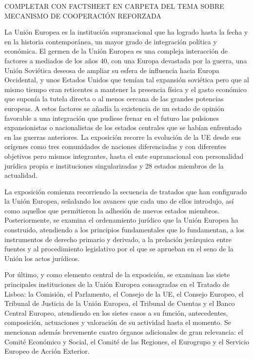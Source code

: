 \documentclass{nuevotema}
\begin{document}
\ideaclave

COMPLETAR CON FACTSHEET EN CARPETA DEL TEMA SOBRE MECANISMO DE COOPERACIÓN REFORZADA

La Unión Europea es la institución supranacional que ha logrado hasta la fecha y en la historia contemporánea, un mayor grado de integración política y económica. El germen de la Unión Europea es una compleja interacción de factores a mediados de los años 40, con una Europa devastada por la guerra, una Unión Soviética deseosa de ampliar su esfera de influencia hacia Europa Occidental, y unos Estados Unidos que temían tal expansión soviética pero que al mismo tiempo eran reticentes a mantener la presencia física y el gasto económico que suponía la tutela directa o al menos cercana de las grandes potencias europeas. A estos factores se añadía la existencia de un estado de opinión favorable a una integración que pudiese frenar en el futuro las pulsiones expansionistas o nacionalistas de los estados centrales que se habían enfrentado en las guerras anteriores. La exposición recorre la evolución de la UE desde sus orígenes como tres comunidades de naciones diferenciadas y con diferentes objetivos pero mismos integrantes, hasta el ente supranacional con personalidad jurídica propia e instituciones singularizadas y 28 estados miembros de la actualidad.

La exposición comienza recorriendo la secuencia de tratados que han configurado la Unión Europea, señalando los avances que cada uno de ellos introdujo, así como aquellos que permitieron la adhesión de nuevos estados miembros. Posteriormente, se examina el ordenamiento jurídico que la Unión Europea ha construido, atendiendo a los principios fundamentales que lo fundamentan, a los instrumentos de derecho primario y derivado, a la prelación jerárquica entre fuentes y al procedimiento legislativo por el que se aprueban en el seno de la Unión los actos jurídicos.

Por último, y como elemento central de la exposición, se examinan las siete principales instituciones de la Unión Europea consagradas en el Tratado de Lisboa: la Comisión, el Parlamento, el Consejo de la UE, el Consejo Europeo, el Tribunal de Justicia de la Unión Europea, el Tribunal de Cuentas y el Banco Central Europeo, atendiendo en los sietes casos a su función, antecedentes, composición, actuaciones y valoración de su actividad hasta el momento. Se mencionan además brevemente cuatro órganos adicionales de gran relevancia: el Comité Económico y Social, el Comité de las Regiones, el Eurogrupo y el Servicio Europeo de Acción Exterior. 
\end{document}
